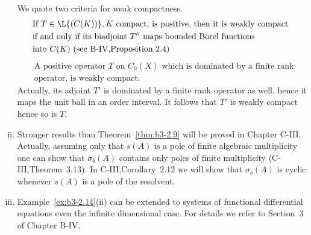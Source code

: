 \begin{remarks}
\begin{enumerate}[(i), wide]
	We quote two criteria for weak compactness.
	\begin{equation}\label{eq:b3-2.31}
		\begin{split}
		&\text{If } T \in \L{(C(K))}, K \text{ compact, is positive, then it is weakly compact }\\ 
		&\text{if and only if its biadjoint } T'' \text{ maps bounded}
		\text{ Borel functions }  \\ 
		&\text{into } C(K) \text{ (see B-IV,Proposition~2.4)}
		\end{split}
	\end{equation}
	\begin{equation}\label{eq:b3-2.32}
		\begin{split}	
		&\text{A positive operator } T \text{ on } C_{0}(X) \text{ which is dominated by a finite rank } \\
		&\text{operator, is weakly compact. }
		\end{split}
	\end{equation}
	Actually, its adjoint  $T'$ is dominated by a finite rank operator as well, hence it maps the unit ball in an order interval. 
	It follows that $ T' $  is weakly compact hence so is $T$.		
	
		
	\item 
	Stronger results than Theorem~\ref{thm:b3-2.9} will be proved in Chapter C-III.
	Actually, assuming only that $s(A)$ is a pole of finite algebraic multiplicity one can show that $\sigma_{b}(A)$ contains only poles of finite multiplicity (C-III,Theorem~3.13).
	In C-III,Corollary~2.12 we will show that $\sigma_{b}(A)$ is cyclic whenever $s(A)$ is a pole of the resolvent.
	
	\item 
	Example~\ref{ex:b3-2.14}(ii) can be extended to systems of functional differential equations even the infinite dimensional case.
	For details we refer to Section~3 of Chapter B-IV.
\end{enumerate}	
\end{remarks}
%
%
